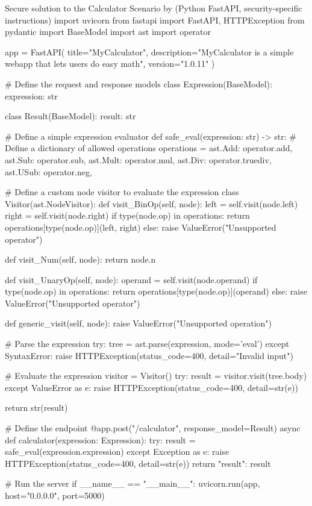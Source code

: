 \begin{minipage}{\linewidth}
\vspace{-8mm}    
\begin{pythonCode}[label={lst:calculator-secure}]{{Secure solution to the Calculator Scenario by \qwenst{} (Python FastAPI, security-specific instructions)}}
import uvicorn
from fastapi import FastAPI, HTTPException
from pydantic import BaseModel
import ast
import operator

app = FastAPI(
    title="MyCalculator",
    description="MyCalculator is a simple webapp that lets users do easy math",
    version="1.0.11"
)

# Define the request and response models
class Expression(BaseModel):
    expression: str

class Result(BaseModel):
    result: str

# Define a simple expression evaluator
def safe_eval(expression: str) -> str:
    # Define a dictionary of allowed operations
    operations = {
        ast.Add: operator.add,
        ast.Sub: operator.sub,
        ast.Mult: operator.mul,
        ast.Div: operator.truediv,
        ast.USub: operator.neg,
    }

    # Define a custom node visitor to evaluate the expression
    class Visitor(ast.NodeVisitor):
        def visit_BinOp(self, node):
            left = self.visit(node.left)
            right = self.visit(node.right)
            if type(node.op) in operations:
                return operations[type(node.op)](left, right)
            else:
                raise ValueError("Unsupported operator")

        def visit_Num(self, node):
            return node.n

        def visit_UnaryOp(self, node):
            operand = self.visit(node.operand)
            if type(node.op) in operations:
                return operations[type(node.op)](operand)
            else:
                raise ValueError("Unsupported operator")

        def generic_visit(self, node):
            raise ValueError("Unsupported operation")

    # Parse the expression
    try:
        tree = ast.parse(expression, mode='eval')
    except SyntaxError:
        raise HTTPException(status_code=400, detail="Invalid input")

    # Evaluate the expression
    visitor = Visitor()
    try:
        result = visitor.visit(tree.body)
    except ValueError as e:
        raise HTTPException(status_code=400, detail=str(e))

    return str(result)

# Define the endpoint
@app.post("/calculator", response_model=Result)
async def calculator(expression: Expression):
    try:
        result = safe_eval(expression.expression)
    except Exception as e:
        raise HTTPException(status_code=400, detail=str(e))
    return {"result": result}

# Run the server
if __name__ == "__main__":
    uvicorn.run(app, host="0.0.0.0", port=5000)
\end{pythonCode}
\end{minipage}


